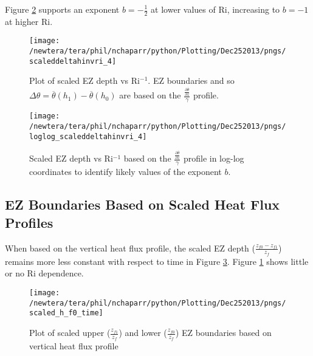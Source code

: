 Figure \ref{fig:loglogdeltahinvri} supports an exponent $b = -\frac{1}{2}$ at lower values of \acs{Ri}, increasing to $b = -1$ at higher \acs{Ri}.    

\clearpage

\begin{figure}[t]
    \centering
    \texttt{[image: /newtera/tera/phil/nchaparr/python/Plotting/Dec252013/pngs/scaleddeltahinvri\_4]}
    \caption[Scaled \acs{EZ} Depth vs \acs{Ri}$^{-1}$]{Plot of scaled \acs{EZ} depth vs \acs{Ri}$^{-1}$. \acs{EZ} boundaries and so $\Delta \theta = \overline{\theta}(h_{1}) - \overline{\theta}(h_{0})$ are based on the $\frac{\frac{\partial \overline{\theta}}{\partial z}}{\gamma}$ profile.}
    \label{fig:deltahinvri_scaled}   %
\end{figure}                      
\vspace{-50mm}
\begin{figure}[b]
\centering
\texttt{[image: /newtera/tera/phil/nchaparr/python/Plotting/Dec252013/pngs/loglog\_scaleddeltahinvri\_4]}\\
\caption[Log-log Plot of scaled \acs{EZ} Depth vs \acs{Ri}$^{-1}$]{Scaled \acs{EZ} depth vs \acs{Ri}$^{-1}$ based on the $\frac{\frac{\partial \overline{\theta}}{\partial z}}{\gamma}$ profile in log-log coordinates to identify likely values of the exponent $b$.}
\label{fig:loglogdeltahinvri}
\end{figure}

\clearpage

\subsection{\acs{EZ} Boundaries Based on Scaled Heat Flux Profiles}
\label{susec:fluxbound}
When based on the vertical heat flux profile, the scaled \acs{EZ} depth ($\frac{z_{f0}-z_{f1}}{z_{f}}$) remains more less constant with respect to time in Figure \ref{fig:scaledEZlims1}. Figure \ref{fig:deltahinvri_scaled} shows little or no \acs{Ri} dependence. 

\begin{figure}[htbp]
    \centering
\texttt{[image: /newtera/tera/phil/nchaparr/python/Plotting/Dec252013/pngs/scaled\_h\_f0\_time]}              
\caption[Scaled \acs{EZ} Boundaries based on the vertical Heat Flux Profile]{Plot of scaled upper ($\frac{z_{f1}}{z_{f}}$) and lower ($\frac{z_{f0}}{z_{f}}$) \acs{EZ} boundaries based on vertical heat flux profile}
    \label{fig:scaledEZlims1}   %
\end{figure}


